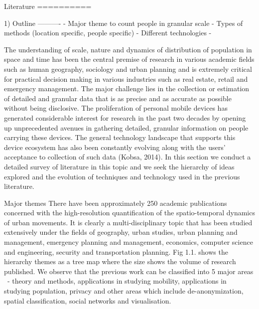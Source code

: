 Literature
==========

1) Outline
----------
 - Major theme to count people in granular scale
 - Types of methods (location specific, people specific)
 - Different technologies
 - 

The understanding of scale, nature and dynamics of distribution of population in space and time has been the central premise of research in various academic fields such as human geography, sociology and urban planning and is extremely critical for practical decision making in various industries such as real estate, retail and emergency management. The major challenge lies in the collection or estimation of detailed and granular data that is as precise and as accurate as possible without being disclosive. The proliferation of personal mobile devices has generated considerable interest for research in the past two decades by opening up unprecedented avenues in gathering detailed, granular information on people carrying these devices. The general technology landscape that supports this device ecosystem has also been constantly evolving along with the users’ acceptance to collection of such data (Kobsa, 2014). In this section we conduct a detailed survey of literature in this topic and we seek the hierarchy of ideas explored and the evolution of techniques and technology used in the previous literature. 

Major themes
There have been approximately 250 academic publications concerned with the high-resolution quantification of the spatio-temporal dynamics of urban movements. It is clearly a multi-disciplinary topic that has been studied extensively under the fields of geography, urban studies, urban planning and management, emergency planning and management, economics, computer science and engineering, security and transportation planning. Fig 1.1. shows the hierarchy themes as a tree map where the size shows the volume of research published. We observe that the previous work can be classified into 5 major areas  - theory and methods, applications in studying mobility, applications in studying population, privacy and other areas which include de-anonymization, spatial classification, social networks and visualisation.

